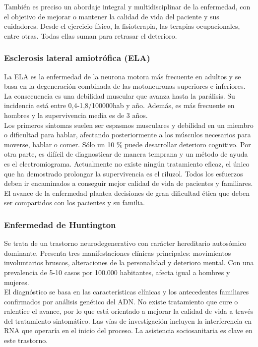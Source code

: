 \documentclass[12pt]{article}
\begin{document}
		También es preciso un abordaje integral y multidisciplinar de la enfermedad, con el objetivo de mejorar o mantener la calidad de vida del paciente y sus cuidadores. Desde el ejercicio físico, la fisioterapia, las terapias ocupacionales, entre otras. Todas ellas suman para retrasar el deterioro.		
		
		\subsubsection{Esclerosis lateral amiotrófica (ELA)}
		
		La ELA es la enfermedad de la neurona motora más frecuente en adultos y se basa en la degeneración combinada de las motoneuronas superiores e inferiores. La consecuencia es una debilidad muscular que avanza hasta la parálisis. Su incidencia está entre 0,4-1,8/100000hab y año. Además, es más frecuente en hombres y la supervivencia media es de 3 años.\\
		
		Los primeros síntomas suelen ser espasmos musculares y debilidad en un miembro o dificultad para hablar, afectando posteriormente a los músculos necesarios para moverse, hablar o comer. Sólo un 10 \% puede desarrollar deterioro cognitivo. Por otra parte, es difícil de diagnosticar de manera temprana y un método de ayuda es el electromiograma. Actualmente no existe ningún tratamiento eficaz, el único que ha demostrado prolongar la supervivencia es el riluzol. Todos los esfuerzos deben ir encaminados a conseguir mejor calidad de vida de pacientes y familiares. El avance de la enfermedad plantea decisiones de gran dificultad ética que deben ser compartidos con los pacientes y su familia.
		
		
		\subsubsection{Enfermedad de Huntington}
		Se trata de un trastorno neurodegenerativo con carácter hereditario autosómico dominante. Presenta tres manifestaciones clínicas principales: movimientos involuntarios bruscos, alteraciones de la personalidad y deterioro mental. Con una prevalencia de 5-10 casos por 100.000 habitantes, afecta igual a hombres y mujeres.\\
		
		El diagnóstico se basa en las características clínicas y los antecedentes familiares confirmados por análisis genético del ADN. No existe tratamiento que cure o ralentice el avance, por lo que está orientado a mejorar la calidad de vida a través del tratamiento sintomático. Las vías de investigación incluyen la interferencia en RNA que operaría en el inicio del proceso. La asistencia sociosanitaria es clave en este trastorno.
				
\end{document}
